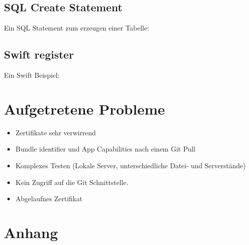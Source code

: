 \subsection{SQL Create Statement}
Ein SQL Statement zum erzeugen einer Tabelle:


\subsection{Swift register}
Ein Swift Beispiel:



\section{Aufgetretene Probleme}


\begin{itemize}
\item Zertifikate sehr verwirrend
\item Bundle identifier und App Capabilities nach einem Git Pull
\item Komplexes Testen (Lokale Server, unterschiedliche Datei- und Serverstände) 
\item Kein Zugriff auf die Git Schnittstelle.
\item Abgelaufnes Zertifikat
\end{itemize}


\newpage
\section{Anhang}
\begin{figure}[h]
\end{figure}